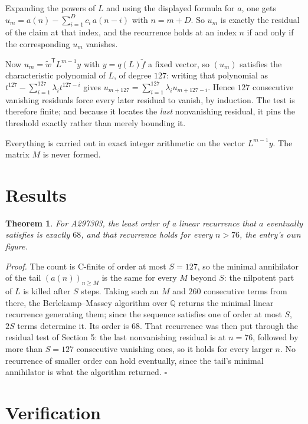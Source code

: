 \documentclass[11pt]{article}
\newtheorem{theorem}{Theorem}
\theoremstyle{definition}
\begin{document}
Expanding the powers of $L$ and using the displayed formula for $a$, one gets $u_m = a(n) - \sum_{i=1}^{D} c_i\,a(n-i)$ with $n = m + D$. So $u_m$ is exactly the residual of the claim at that index, and the recurrence holds at an index $n$ if and only if the corresponding $u_m$ vanishes.

Now $u_m = \tilde w^{\mathsf T} L^{m-1} y$ with $y = q(L)\tilde f$ a fixed vector, so $(u_m)$ satisfies the characteristic polynomial of $L$, of degree $127$: writing that polynomial as $t^{127} - \sum_{i=1}^{127} \lambda_i t^{127-i}$ gives $u_{m+127} = \sum_{i=1}^{127} \lambda_i u_{m+127-i}$. Hence $127$ consecutive vanishing residuals force every later residual to vanish, by induction. The test is therefore finite; and because it locates the {\itshape last} nonvanishing residual, it pins the threshold exactly rather than merely bounding it.

Everything is carried out in exact integer arithmetic on the vector $L^{m-1}y$. The matrix $M$ is never formed.

\section{Results}

\begin{theorem} For A297303, the least order of a linear recurrence that $a$ eventually satisfies is exactly $68$, and that recurrence holds for every $n > 76$, the entry's own figure.\end{theorem}

{\itshape Proof.} The count is C-finite of order at most $S = 127$, so the minimal annihilator of the tail $(a(n))_{n \ge M}$ is the same for every $M$ beyond $S$: the nilpotent part of $L$ is killed after $S$ steps. Taking such an $M$ and $260$ consecutive terms from there, the Berlekamp--Massey algorithm over $\mathbb{Q}$ returns the minimal linear recurrence generating them; since the sequence satisfies one of order at most $S$, $2S$ terms determine it. Its order is $68$. That recurrence was then put through the residual test of Section 5: the last nonvanishing residual is at $n = 76$, followed by more than $S = 127$ consecutive vanishing ones, so it holds for every larger $n$. No recurrence of smaller order can hold eventually, since the tail's minimal annihilator is what the algorithm returned. $\square$

\section{Verification}
\end{document}
